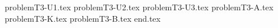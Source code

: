\documentclass{../../../../style/mkimain}
\begin{document}
{problemT3-U1.tex}
{problemT3-U2.tex}
{problemT3-U3.tex}
{problemT3-A.tex}
{problemT3-K.tex}
{problemT3-B.tex}
{end.tex}
\end{document}
